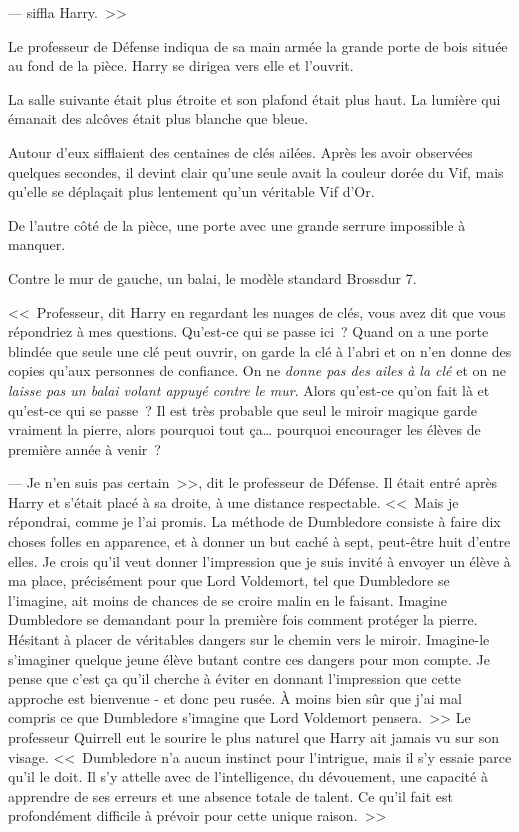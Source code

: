 ---  siffla Harry.~>>

Le professeur de Défense indiqua de sa main armée la grande porte de bois située au fond de la pièce. Harry se dirigea vers elle et l'ouvrit.

\later

La salle suivante était plus étroite et son plafond était plus haut. La lumière qui émanait des alcôves était plus blanche que bleue.

Autour d'eux sifflaient des centaines de clés ailées. Après les avoir observées quelques secondes, il devint clair qu'une seule avait la couleur dorée du Vif, mais qu'elle se déplaçait plus lentement qu'un véritable Vif d'Or.

De l'autre côté de la pièce, une porte avec une grande serrure impossible à manquer.

Contre le mur de gauche, un balai, le modèle standard Brossdur 7.

<<~Professeur, dit Harry en regardant les nuages de clés, vous avez dit que vous répondriez à mes questions. Qu'est-ce qui se passe ici~? Quand on a une porte blindée que seule une clé peut ouvrir, on garde la clé à l'abri et on n'en donne des copies qu'aux personnes de confiance. On ne \emph{donne pas des ailes à la clé} et on ne \emph{laisse pas un balai volant appuyé contre le mur}. Alors qu'est-ce qu'on fait là et qu'est-ce qui se passe~? Il est très probable que seul le miroir magique garde vraiment la pierre, alors pourquoi tout ça… pourquoi encourager les élèves de première année à venir~?

--- Je n'en suis pas certain~>>, dit le professeur de Défense. Il était entré après Harry et s'était placé à sa droite, à une distance respectable. <<~Mais je répondrai, comme je l'ai promis. La méthode de Dumbledore consiste à faire dix choses folles en apparence, et à donner un but caché à sept, peut-être huit d'entre elles. Je crois qu'il veut donner l'impression que je suis invité à envoyer un élève à ma place, précisément pour que Lord Voldemort, tel que Dumbledore se l'imagine, ait moins de chances de se croire malin en le faisant. Imagine Dumbledore se demandant pour la première fois comment protéger la pierre. Hésitant à placer de véritables dangers sur le chemin vers le miroir. Imagine-le s'imaginer quelque jeune élève butant contre ces dangers pour mon compte. Je pense que c'est ça qu'il cherche à éviter en donnant l'impression que cette approche est bienvenue - et donc peu rusée. À moins bien sûr que j'ai mal compris ce que Dumbledore s'imagine que Lord Voldemort pensera.~>> Le professeur Quirrell eut le sourire le plus naturel que Harry ait jamais vu sur son visage. <<~Dumbledore n'a aucun instinct pour l'intrigue, mais il s'y essaie parce qu'il le doit. Il s'y attelle avec de l'intelligence, du dévouement, une capacité à apprendre de ses erreurs et une absence totale de talent. Ce qu'il fait est profondément difficile à prévoir pour cette unique raison.~>>

